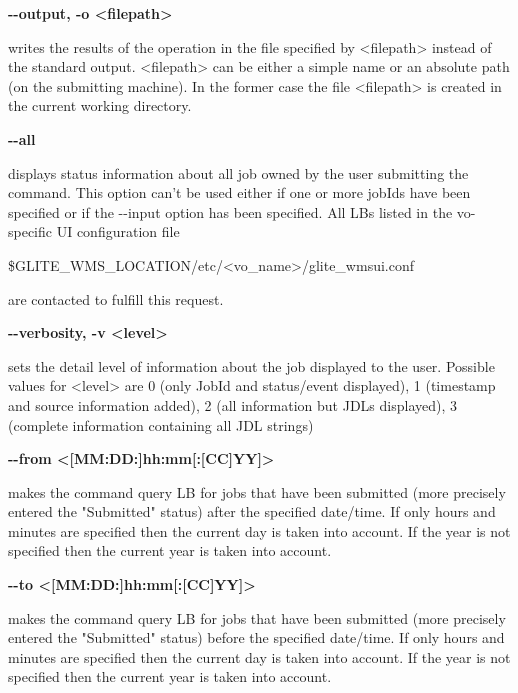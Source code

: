 \textbf{-{}-output, -o <filepath>}

writes the results of the operation in the file specified by <filepath> instead of the standard output. 
<filepath> can be either a simple name or an absolute path (on the submitting machine). In the former case 
the file <filepath> is created in the current working directory.





\textbf{-{}-all}

displays status information about all job owned by the user submitting the command. This option can't 
be used
either if one or more jobIds have been specified or if the -{}-input option has been specified. All LBs
listed in the vo-specific UI configuration file

\$GLITE\_WMS\_LOCATION/etc/<vo\_name>/glite\_wmsui.conf 

 are contacted to fulfill this request.





\textbf{-{}-verbosity, -v <level>}

sets the detail level of information about the job displayed to the user. Possible values for <level> are 
0 (only JobId and status/event displayed), 1 (timestamp and source information added), 
 2 (all information but JDLs displayed), 3 (complete information containing all JDL strings)





\textbf{-{}-from <[MM:DD:]hh:mm[:[CC]YY]>}

makes the command query LB for jobs that have been submitted (more precisely entered the "Submitted" status) 
after the specified date/time.
If only hours and minutes are specified then the current day is taken into account. 
If the year is not specified then the current year is taken into account.





\textbf{-{}-to <[MM:DD:]hh:mm[:[CC]YY]>}

makes the command query LB for jobs that have been submitted (more precisely entered the "Submitted" status) 
before the specified date/time.
If only hours and minutes are specified then the current day is taken into account.
 If the year is not specified then the current year is taken into account.





